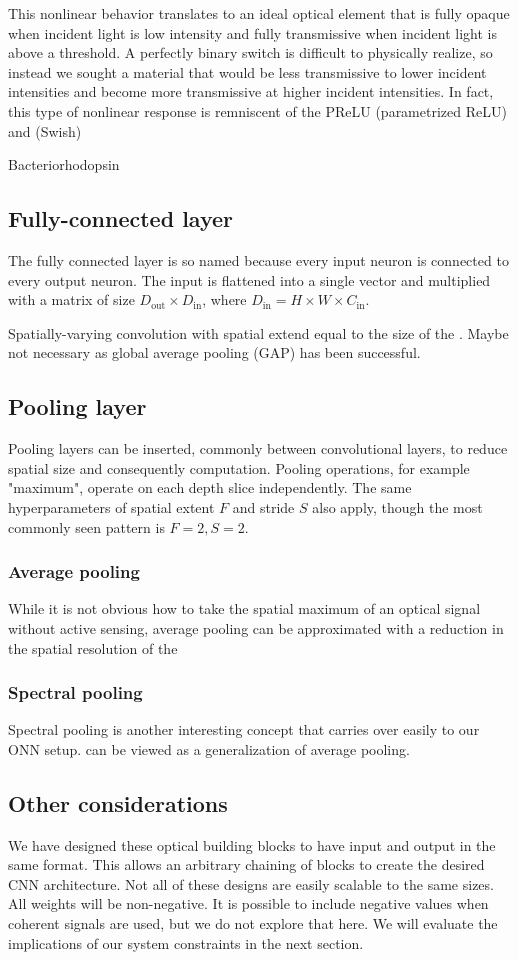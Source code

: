This nonlinear behavior translates to an ideal optical element that is fully opaque when incident light is low intensity and fully transmissive when incident light is above a threshold. A perfectly binary switch is difficult to physically realize, so instead we sought a material that would be less transmissive to lower incident intensities and become more transmissive at higher incident intensities. In fact, this type of nonlinear response is remniscent of the PReLU (parametrized ReLU) \cite{he2015delving} and (Swish) \cite{ramachandran2017searching}

Bacteriorhodopsin


\subsection{Fully-connected layer}
The fully connected layer is so named because every input neuron is connected to every output neuron.
The input is flattened into a single vector and multiplied with a matrix of size $D_\text{out} \times D_\text{in}$, where $D_\text{in} = H \times W \times C_\text{in}$.

Spatially-varying convolution with spatial extend equal to the size of the . Maybe not necessary as global average pooling (GAP) has been successful.

\subsection{Pooling layer}
Pooling layers can be inserted, commonly between convolutional layers, to reduce spatial size and consequently computation. Pooling operations, for example "maximum", operate on each depth slice independently. The same hyperparameters of spatial extent $F$ and stride $S$ also apply, though the most commonly seen pattern is $F=2, S=2$.

\subsubsection{Average pooling}
While it is not obvious how to take the spatial maximum of an optical signal without active sensing, average pooling can be approximated with a reduction in the spatial resolution of the 

\subsubsection{Spectral pooling}
Spectral pooling is another interesting concept that carries over easily to our ONN setup. can be viewed as a generalization of average pooling. 

\subsection{Other considerations}
We have designed these optical building blocks to have input and output in the same format. This allows an arbitrary chaining of blocks to create the desired CNN architecture. Not all of these designs are easily scalable to the same sizes. All weights will be non-negative. It is possible to include negative values when coherent signals are used, but we do not explore that here. We will evaluate the implications of our system constraints in the next section.